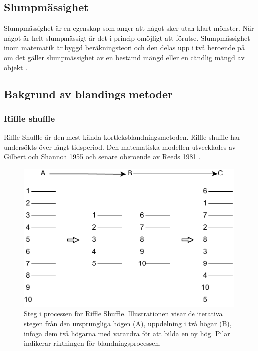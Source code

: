 \documentclass[swedish,a4paper]{article}
\begin{document}
\subsection{Slumpmässighet}
\label{sec:slump}

Slumpmässighet är en egenskap som anger att något sker utan klart mönster. När
något är helt slumpmässigt är det i princip omöjligt att förutse. Slumpmässighet
inom matematik är byggd beräknings\-teori och den delas upp i två beroende på om
det gäller slumpmässighet av en bestämd mängd eller en oändlig mängd av objekt
\parencite[49-66]{Terwijn2016}.

\subsection{Bakgrund av blandings metoder}

\subsubsection{Riffle shuffle}
\label{sec:riffle_shuffle}
Riffle Shuffle är den mest kända kortleksblandningsmetoden. 
Riffle shuffle har undersökts över långt tidsperiod. Den matematiska modellen
utvecklades av Gilbert och Shannon 1955 och senare oberoende av Reeds 1981 
\parencite[77-79]{gsr2003mathematical}. 

\begin{figure}[H]
	\begin{center}
		\includegraphics{images/rifflle-shuffle.pdf}
	\end{center}
	\captionsetup{justification=centering,margin=2cm}
	\caption{Steg i processen för Riffle Shuffle. Illustrationen visar de
	iterativa stegen från den ursprungliga högen (A), uppdelning i två
	högar (B), infoga dem två högarna med varandra för att bilda en ny hög.
        Pilar indikerar riktningen för blandningsprocessen.}
	\label{fig:riffle_shuffle_1}
\end{figure}
\end{document}
